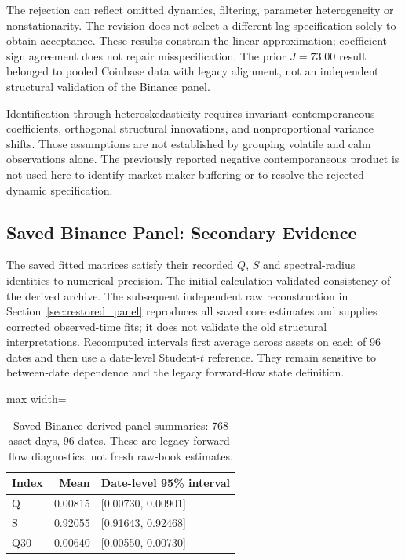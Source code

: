 \documentclass[12pt]{article}
\theoremstyle{definition}
\theoremstyle{remark}
\begin{document}
The rejection can reflect omitted dynamics, filtering, parameter heterogeneity or nonstationarity. The revision does not select a different lag specification solely to obtain acceptance. These results constrain the linear approximation; coefficient sign agreement does not repair misspecification. The prior $J=73.00$ result belonged to pooled Coinbase data with legacy alignment, not an independent structural validation of the Binance panel.

Identification through heteroskedasticity requires invariant contemporaneous coefficients, orthogonal structural innovations, and nonproportional variance shifts. Those assumptions are not established by grouping volatile and calm observations alone. The previously reported negative contemporaneous product is not used here to identify market-maker buffering or to resolve the rejected dynamic specification.

\subsection{Saved Binance Panel: Secondary Evidence}
The saved fitted matrices satisfy their recorded $Q$, $S$ and spectral-radius identities to numerical precision. The initial calculation validated consistency of the derived archive. The subsequent independent raw reconstruction in Section~\ref{sec:restored_panel} reproduces all saved core estimates and supplies corrected observed-time fits; it does not validate the old structural interpretations. Recomputed intervals first average across assets on each of 96 dates and then use a date-level Student-$t$ reference. They remain sensitive to between-date dependence and the legacy forward-flow state definition.

\begin{table}[htbp]
\centering\small
\caption{Saved Binance derived-panel summaries: 768 asset-days, 96 dates. These are legacy forward-flow diagnostics, not fresh raw-book estimates.}
\label{tab:panel_revised}
\begin{adjustbox}{max width=\textwidth}
\begin{tabular}{lrl}\toprule
Index & Mean & Date-level 95\% interval \\\midrule
Q & 0.00815 & [0.00730, 0.00901] \\
S & 0.92055 & [0.91643, 0.92468] \\
Q30 & 0.00640 & [0.00550, 0.00730] \\
\bottomrule\end{tabular}
\end{adjustbox}
\end{table}
\end{document}
